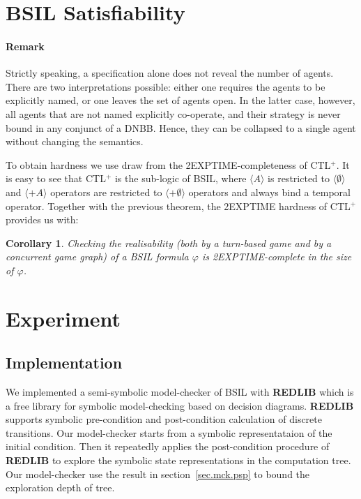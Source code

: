 \documentclass[11pt]{article}
\newtheorem{corollary}[theorem]{Corollary}
\begin{document}
\section{BSIL Satisfiability\label{sec.sat}} 






\paragraph{Remark}
Strictly speaking, a specification alone does not reveal the number of agents. There are two interpretations possible: either one requires the agents to be explicitly named, or one leaves the set of agents open. In the latter case, however, all agents that are not named explicitly co-operate, and their strategy is never bound in any conjunct of a DNBB. Hence, they can be collapsed to a single agent without changing the semantics.
\medskip

To obtain hardness we use draw from the 2EXPTIME-completeness of CTL$^+$.
It is easy to see that CTL$^+$ is the sub-logic of BSIL, where $\langle A \rangle$ is restricted to $\langle \emptyset \rangle$ and $\langle+A \rangle$ operators are restricted to $\langle+\emptyset \rangle$ operators and always bind a temporal operator.
Together with the previous theorem, the 2EXPTIME hardness of CTL$^+$  \cite{Wilke99} provides us with:

\begin{corollary}
Checking the realisability (both by a turn-based game and by a concurrent game graph) of a BSIL formula $\varphi$ is 2EXPTIME-complete in the size of $\varphi$.
\end{corollary}



\section{Experiment \label{sec.expe}}

\subsection{Implementation} 

We implemented a semi-symbolic model-checker of BSIL with {\bf REDLIB} 
\cite{Wang03,Wang08a,Wang08b,Wang13,Wang14}
which is a free library for symbolic model-checking based on decision diagrams. 
{\bf REDLIB} supports symbolic pre-condition and post-condition calculation 
of discrete transitions.  
Our model-checker starts from a symbolic representataion of the initial 
condition. 
Then it repeatedly applies the post-condition procedure of {\bf REDLIB}
to explore the symbolic state representations in the computation tree.  
Our model-checker use the result in section~\ref{sec.mck.psp} to bound 
the exploration depth of tree.   
\end{document}
